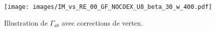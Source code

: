 \documentclass[a4paper, 11pt]{article}
\begin{document}
\begin{figure}[H]
\begin{center}
\caption{\small Illustration de $\Gamma_{ab}$ avec corrections de vertex.}
\texttt{[image: images/IM\_vs\_RE\_00\_GF\_NOCOEX\_U8\_beta\_30\_w\_400.pdf]}
\label{fig:superfluid_stiffness:superfluid_stiffness_with_vertex_corrections}	
\end{center}
\end{figure}
\end{document}
